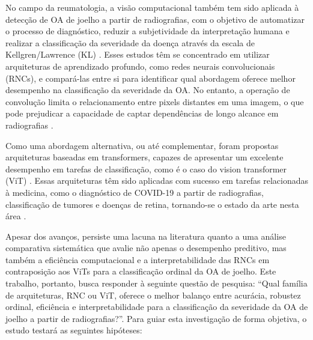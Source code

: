 No campo da reumatologia, a visão computacional também tem sido aplicada à detecção de OA de joelho a partir de radiografias, com o objetivo de automatizar o processo de diagnóstico, reduzir a subjetividade da interpretação humana e realizar a classificação da severidade da doença através da escala de Kellgren/Lawrence (KL) \cite{Mohammed2023}. Esses estudos têm se concentrado em utilizar arquiteturas de aprendizado profundo, como redes neurais convolucionais (RNCs), e compará-las entre si para identificar qual abordagem oferece melhor desempenho na classificação da severidade da OA. No entanto, a operação de convolução limita o relacionamento entre pixels distantes em uma imagem, o que pode prejudicar a capacidade de captar dependências de longo alcance em radiografias \cite{Shamshad2023}.

Como uma abordagem alternativa, ou até complementar, foram propostas arquiteturas baseadas em transformers, capazes de apresentar um excelente desempenho em tarefas de classificação, como é o caso do vision transformer (ViT) \cite{Dosovitskiy2021}. Essas arquiteturas têm sido aplicadas com sucesso em tarefas relacionadas à medicina, como o diagnóstico de COVID-19 a partir de radiografias, classificação de tumores e doenças de retina, tornando-se o estado da arte nesta área \cite{Shamshad2023}.

Apesar dos avanços, persiste uma lacuna na literatura quanto a uma análise comparativa sistemática que avalie não apenas o desempenho preditivo, mas também a eficiência computacional e a interpretabilidade das RNCs em contraposição aos ViTs para a classificação ordinal da OA de joelho. Este trabalho, portanto, busca responder à seguinte questão de pesquisa: ``Qual família de arquiteturas, RNC ou ViT, oferece o melhor balanço entre acurácia, robustez ordinal, eficiência e interpretabilidade para a classificação da severidade da OA de joelho a partir de radiografias?''. Para guiar esta investigação de forma objetiva, o estudo testará as seguintes hipóteses:

